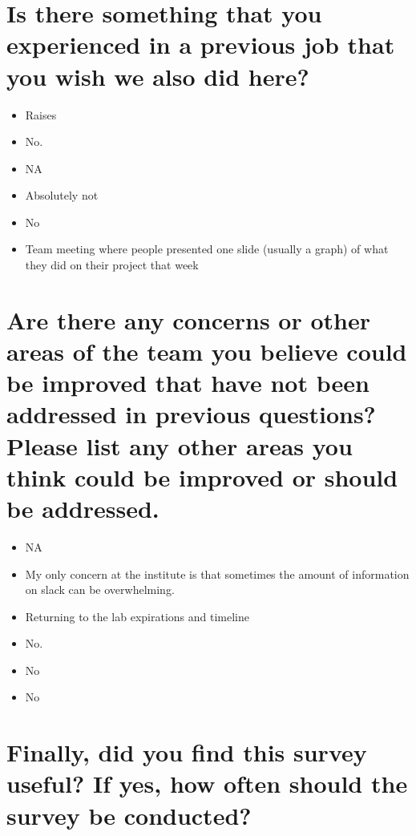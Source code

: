 \documentclass[
]{book}
\providecommand{\tightlist}{%
  \setlength{\itemsep}{0pt}\setlength{\parskip}{0pt}}
\begin{document}
\hypertarget{is-there-something-that-you-experienced-in-a-previous-job-that-you-wish-we-also-did-here}{%
\section{Is there something that you experienced in a previous job that you wish we also did here?}\label{is-there-something-that-you-experienced-in-a-previous-job-that-you-wish-we-also-did-here}}

\begin{itemize}
\tightlist
\item
  Raises
\item
  No.
\item
  NA
\item
  Absolutely not
\item
  No
\item
  Team meeting where people presented one slide (usually a graph) of what they did on their project that week
\end{itemize}

\hypertarget{are-there-any-concerns-or-other-areas-of-the-team-you-believe-could-be-improved-that-have-not-been-addressed-in-previous-questions-please-list-any-other-areas-you-think-could-be-improved-or-should-be-addressed.}{%
\section{Are there any concerns or other areas of the team you believe could be improved that have not been addressed in previous questions? Please list any other areas you think could be improved or should be addressed.}\label{are-there-any-concerns-or-other-areas-of-the-team-you-believe-could-be-improved-that-have-not-been-addressed-in-previous-questions-please-list-any-other-areas-you-think-could-be-improved-or-should-be-addressed.}}

\begin{itemize}
\tightlist
\item
  NA
\item
  My only concern at the institute is that sometimes the amount of information on slack can be overwhelming.
\item
  Returning to the lab expirations and timeline
\item
  No.
\item
  No
\item
  No
\end{itemize}

\hypertarget{finally-did-you-find-this-survey-useful-if-yes-how-often-should-the-survey-be-conducted}{%
\section{Finally, did you find this survey useful? If yes, how often should the survey be conducted?}\label{finally-did-you-find-this-survey-useful-if-yes-how-often-should-the-survey-be-conducted}}
\end{document}
